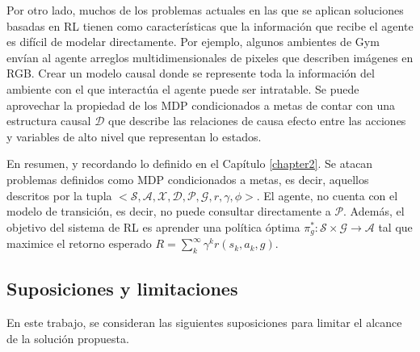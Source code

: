 
Por otro lado, muchos de los problemas actuales en las que se aplican soluciones 
basadas en RL tienen como características que la información
que recibe el agente es difícil de modelar directamente. Por ejemplo, algunos 
ambientes de Gym \cite{gym2016brockman} envían al agente arreglos multidimensionales
de pixeles que describen imágenes en RGB.
Crear un modelo causal donde se represente toda
la información del ambiente con el que interactúa el agente
puede ser intratable.
Se puede aprovechar la propiedad de los MDP condicionados a metas de contar con una
estructura causal $\mathcal{D}$ que describe las relaciones de causa efecto entre las acciones y variables de alto nivel que representan lo estados.

En resumen, y recordando lo definido en el Capítulo \ref{chapter2}. Se atacan problemas
definidos como MDP condicionados a metas, es decir, aquellos descritos por la tupla $<\mathcal{S}, \mathcal{A}, \mathcal{X},\mathcal{D}, \mathcal{P}, \mathcal{G}, r, \gamma, \phi>$. El agente, no cuenta con el modelo de transición, es decir, no puede consultar directamente a $\mathcal{P}$. 
Además, el objetivo del sistema de RL es aprender una 
política óptima  $\pi^*_g: \mathcal{S} \times \mathcal{G} \rightarrow \mathcal{A}$ tal que maximice el retorno esperado $R = \sum_{k}^{\infty}\gamma^{k} r(s_k, a_k, g)$.

\subsection{Suposiciones y limitaciones}

En este trabajo, se consideran  las siguientes suposiciones para limitar el alcance de la solución propuesta.

